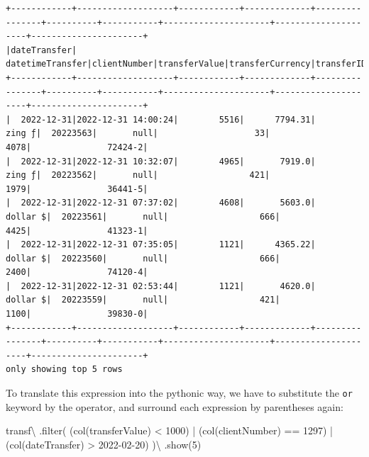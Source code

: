 \documentclass[
  11pt,
  letterpaper,
  DIV=11,
  numbers=noendperiod]{scrreprt}
\newenvironment{Shaded}{\begin{snugshade}}{\end{snugshade}}
\newcommand{\BuiltInTok}[1]{\textcolor[rgb]{0.00,0.23,0.31}{#1}}
\newcommand{\DecValTok}[1]{\textcolor[rgb]{0.68,0.00,0.00}{#1}}
\newcommand{\NormalTok}[1]{\textcolor[rgb]{0.00,0.23,0.31}{#1}}
\newcommand{\OperatorTok}[1]{\textcolor[rgb]{0.37,0.37,0.37}{#1}}
\newcommand{\StringTok}[1]{\textcolor[rgb]{0.13,0.47,0.30}{#1}}
\begin{document}
\begin{verbatim}
+------------+-------------------+------------+-------------+----------------+----------+-----------+---------------------+---------------------+----------------------+
|dateTransfer|   datetimeTransfer|clientNumber|transferValue|transferCurrency|transferID|transferLog|destinationBankNumber|destinationBankBranch|destinationBankAccount|
+------------+-------------------+------------+-------------+----------------+----------+-----------+---------------------+---------------------+----------------------+
|  2022-12-31|2022-12-31 14:00:24|        5516|      7794.31|          zing ƒ|  20223563|       null|                   33|                 4078|               72424-2|
|  2022-12-31|2022-12-31 10:32:07|        4965|       7919.0|          zing ƒ|  20223562|       null|                  421|                 1979|               36441-5|
|  2022-12-31|2022-12-31 07:37:02|        4608|       5603.0|        dollar $|  20223561|       null|                  666|                 4425|               41323-1|
|  2022-12-31|2022-12-31 07:35:05|        1121|      4365.22|        dollar $|  20223560|       null|                  666|                 2400|               74120-4|
|  2022-12-31|2022-12-31 02:53:44|        1121|       4620.0|        dollar $|  20223559|       null|                  421|                 1100|               39830-0|
+------------+-------------------+------------+-------------+----------------+----------+-----------+---------------------+---------------------+----------------------+
only showing top 5 rows
\end{verbatim}

To translate this expression into the pythonic way, we have to
substitute the \texttt{or} keyword by the \texttt{\textbar{}} operator,
and surround each expression by parentheses again:

\begin{Shaded}
\begin{Highlighting}[]
\NormalTok{transf}\OperatorTok{\textbackslash{}}
\NormalTok{  .}\BuiltInTok{filter}\NormalTok{(}
\NormalTok{    (col(}\StringTok{\textquotesingle{}transferValue\textquotesingle{}}\NormalTok{) }\OperatorTok{\textless{}} \DecValTok{1000}\NormalTok{) }\OperatorTok{|}
\NormalTok{    (col(}\StringTok{\textquotesingle{}clientNumber\textquotesingle{}}\NormalTok{) }\OperatorTok{==} \DecValTok{1297}\NormalTok{) }\OperatorTok{|}
\NormalTok{    (col(}\StringTok{\textquotesingle{}dateTransfer\textquotesingle{}}\NormalTok{) }\OperatorTok{\textgreater{}} \StringTok{\textquotesingle{}2022{-}02{-}20\textquotesingle{}}\NormalTok{)}
\NormalTok{  )}\OperatorTok{\textbackslash{}}
\NormalTok{  .show(}\DecValTok{5}\NormalTok{)}
\end{Highlighting}
\end{Shaded}
\end{document}

